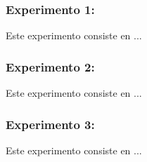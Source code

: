 \subsubsection{Experimento 1: }

Este experimento consiste en ... %

\subsubsection{Experimento 2: }

Este experimento consiste en ... %

\subsubsection{Experimento 3: }

Este experimento consiste en ... %
